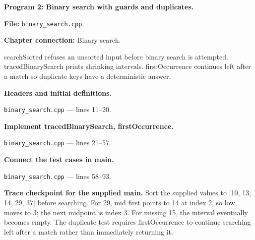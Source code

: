 \textbf{Program 2: Binary search with guards and duplicates.}

\textbf{File:} \texttt{binary\_search.cpp}.

\textbf{Chapter connection:} Binary search.

searchSorted refuses an unsorted input before binary search is attempted. tracedBinarySearch prints shrinking intervals. firstOccurrence continues left after a match so duplicate keys have a deterministic answer.



\begin{utpsteps}\setcounter{enumi}{0}\item \textbf{Headers and initial definitions.}\end{utpsteps}

\texttt{binary\_search.cpp} --- lines 11--20.




\tcbbreak

\begin{utpsteps}\setcounter{enumi}{1}\item \textbf{Implement tracedBinarySearch, firstOccurrence.}\end{utpsteps}

\texttt{binary\_search.cpp} --- lines 21--57.






\tcbbreak

\begin{utpsteps}\setcounter{enumi}{2}\item \textbf{Connect the test cases in main.}\end{utpsteps}

\texttt{binary\_search.cpp} --- lines 58--93.

\textbf{Trace checkpoint for the supplied main.} Sort the supplied values to [10, 13, 14, 29, 37] before searching. For 29, mid first points to 14 at index 2, so low moves to 3; the next midpoint is index 3. For missing 15, the interval eventually becomes empty. The duplicate test requires firstOccurrence to continue searching left after a match rather than immediately returning it.




